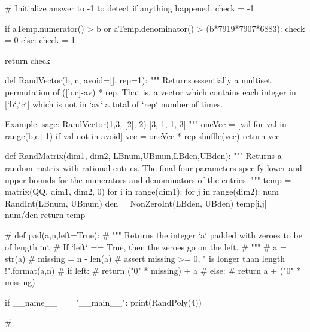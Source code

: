 \begin{sagesilent}
    # Initialize answer to -1 to detect if anything happened.
    check = -1
    
    if aTemp.numerator() > b or aTemp.denominator() > (b*7919*7907*6883):
        check = 0
    else:
        check = 1
    
    return check

def RandVector(b, c, avoid=[], rep=1):
    """ Returns essentially a multiset permutation of ([b,c]-av) * rep.
        That is, a vector which contains each integer in [`b`,`c`] which is not in `av` a total of `rep` number of times.

        Example:
        sage: RandVector(1,3, [2], 2)
        [3, 1, 1, 3]
    """
    oneVec = [val for val in range(b,c+1) if val not in avoid]
    vec = oneVec * rep
    shuffle(vec)
    return vec

def RandMatrix(dim1, dim2, LBnum,UBnum,LBden,UBden):
    """ Returns a random matrix with rational entries. 
        The final four parameters specify lower and upper bounds for the 
        numerators and denominators of the entries.
    """
    temp = matrix(QQ, dim1, dim2, 0)
    for i in range(dim1):
        for j in range(dim2):
            num = RandInt(LBnum, UBnum)
            den = NonZeroInt(LBden, UBden)
            temp[i,j] = num/den
    return temp

# def pad(a,n,left=True):
#   """ Returns the integer `a` padded with zeroes to be of length `n`.
#       If `left` == True, then the zeroes go on the left.
#   """
#   a = str(a)
#   missing = n - len(a) 
#   assert missing >= 0, "{} is longer than length {}!".format(a,n)
#   if left:
#       return ("0" * missing) + a
#   else:
#       return a + ("0" * missing)

if __name__ == "__main__":
    print(RandPoly(4))

# \end{sagesilent}
